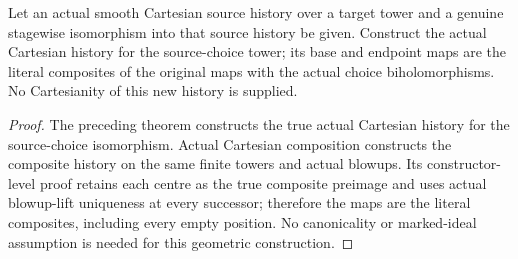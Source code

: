 \begin{theorem}
\label{hir:original-source-choice-composed-cartesian-tower}
\leanok
Let an actual smooth Cartesian source history over a target tower and a
genuine stagewise isomorphism into that source history be given.
Construct the actual Cartesian history for the source-choice tower;
its base and endpoint maps are the literal composites of the original
maps with the actual choice biholomorphisms. No Cartesianity of this
new history is supplied.
\end{theorem}
\begin{proof}
The preceding theorem constructs the true actual Cartesian history for
the source-choice isomorphism. Actual Cartesian composition constructs
the composite history on the same finite towers and actual blowups.
Its constructor-level proof retains each centre as the true composite
preimage and uses actual blowup-lift uniqueness at every successor;
therefore the maps are the literal composites, including every empty
position. No canonicality or marked-ideal assumption is needed for this
geometric construction.
\end{proof}

